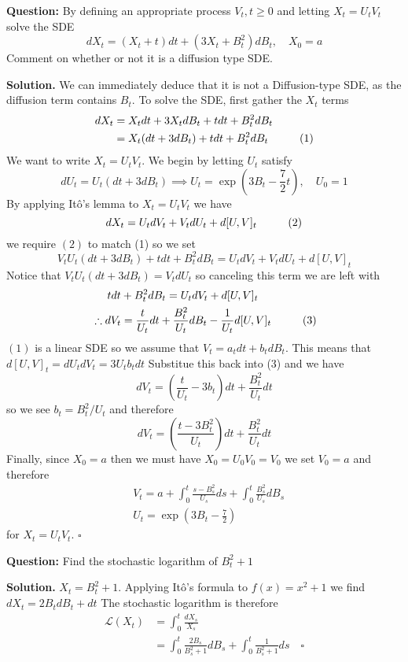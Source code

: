 \documentclass{article}
\begin{document}
\begin{tcolorbox}[colframe=black,colback=gray!5,boxrule=0.5pt]
\textbf{Question:} By defining an appropriate process $V_t, t\geq0$ and letting $X_t = U_tV_t$ solve the SDE
$$dX_t = (X_t+t)dt + (3X_t+B_t^2)dB_t, \quad X_0=a$$
Comment on whether or not it is a diffusion type SDE. 
\end{tcolorbox}
\textbf{Solution.} We can immediately deduce that it is not a Diffusion-type SDE, as the diffusion term contains $B_t$. To solve the SDE, first gather the $X_t$ terms
\begin{align*}
    dX_t &= X_t dt + 3X_tdB_t + tdt + B_t^2dB_t \\
    &= X_t(dt + 3dB_t) + tdt+B_t^2dB_t \hspace{10mm} (1)
\end{align*}
We want to write $X_t = U_tV_t$. We begin by letting $U_t$ satisfy
$$dU_t = U_t(dt + 3dB_t) \implies U_t=\exp\left(3B_t -\frac{7}{2}t\right), \quad U_0=1$$
By applying Itô's lemma to $X_t = U_t V_t$ we have 
$$dX_t = U_tdV_t + V_tdU_t + d[U,V]_t \hspace{10mm} (2)$$
we require $(2)$ to match (1) so we set 
$$V_tU_t(dt + 3dB_t) + tdt+B_t^2dB_t = U_tdV_t + V_tdU_t + d[U,V]_t$$
Notice that $V_tU_t(dt + 3dB_t) = V_tdU_t$ so canceling this term we are left with 
\begin{align*}
    &\hspace{5mm} tdt+B_t^2dB_t = U_tdV_t + d[U,V]_t  \\
    &\therefore dV_t = \frac{t}{U_t}dt + \frac{B_t^2}{U_t}dB_t - \frac{1}{U_t}d[U,V]_t \hspace{10mm} (3)
\end{align*}
$(1)$ is a linear SDE so we assume that $V_t = a_tdt + b_tdB_t$. This means that $d[U,V]_t = dU_tdV_t = 3U_tb_t dt$ Substitue this back into (3) and we have 
$$dV_t = \left(\frac{t}{U_t} - 3b_t\right)dt + \frac{B_t^2}{U_t}dt$$
so we see $b_t = B_t^2/U_t$ and therefore 
$$dV_t = \left(\frac{t-3B_t^2}{U_t}\right)dt + \frac{B_t^2}{U_t}dt$$
Finally, since $X_0 = a$ then we must have $X_ 0 = U_0V_0 = V_0$ we set $V_0=a$ and therefore
\begin{align*}
    & V_t = a + \int_0^t \frac{s-B_s^2}{U_s}ds + \int_0^t \frac{B_s^2}{U_s}dB_s \\
    & U_t = \exp\left(3B_t-\frac{7}{2}\right)
\end{align*}
for $X_t = U_tV_t$. $\square$

\begin{tcolorbox}[colframe=black,colback=gray!5,boxrule=0.5pt]
\textbf{Question:} Find the stochastic logarithm of $B_t^2+1$
\end{tcolorbox}
\textbf{Solution.} $X_t = B_t^2+1$. Applying Itô's formula to $f(x) = x^2+1$ we find $dX_t = 2B_tdB_t + dt$ The stochastic logarithm is therefore
\begin{align*}
    \mathcal{L}(X_t) &= \int_0^t\frac{dX_s}{X_s}  \\
    &= \int_0^t\frac{2B_s}{B_s^2+1}dB_s + \int_0^t\frac{1}{B_s^2+1}ds \quad \square
\end{align*}
\end{document}
